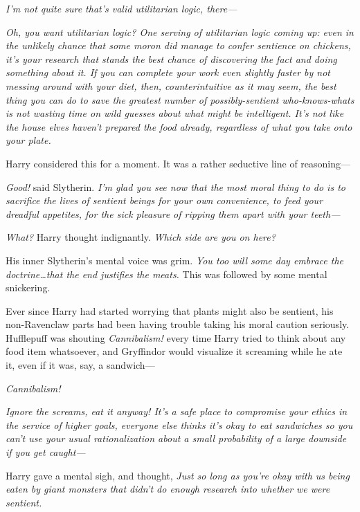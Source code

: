 \emph{I’m not quite sure that’s valid utilitarian logic, there—}

\emph{Oh, you want utilitarian logic? One serving of utilitarian logic coming up: even in the unlikely chance that some moron \emph{did} manage to confer sentience on chickens, it’s \emph{your} research that stands the best chance of discovering the fact and doing something about it. If you can complete your work even slightly faster by \emph{not} messing around with your diet, then, counterintuitive as it may seem, the \emph{best} thing you can do to save the greatest number of possibly-sentient who-knows-whats is \emph{not} wasting time on wild guesses about what might be intelligent. It’s not like the house elves haven’t prepared the food already, regardless of what you take onto your plate.}

Harry considered this for a moment. It was a rather seductive line of reasoning—

\emph{Good!} said Slytherin. \emph{I’m glad you see now that the most moral thing to do is to sacrifice the lives of sentient beings for your own convenience, to feed your dreadful appetites, for the sick pleasure of ripping them apart with your teeth—}

\emph{What?} Harry thought indignantly. \emph{Which side are you \emph{on} here?}

His inner Slytherin’s mental voice was grim. \emph{You too will some day embrace the doctrine…that the end justifies the meats.} This was followed by some mental snickering.

Ever since Harry had started worrying that plants might also be sentient, his non-Ravenclaw parts had been having trouble taking his moral caution seriously. Hufflepuff was shouting \emph{Cannibalism!} every time Harry tried to think about any food item whatsoever, and Gryffindor would visualize it screaming while he ate it, even if it was, say, a sandwich—

\emph{Cannibalism!}

\emph{}

\emph{Ignore the screams, eat it anyway! It’s a safe place to compromise your ethics in the service of higher goals, everyone \emph{else} thinks it’s okay to eat sandwiches so you can’t use your usual rationalization about a small probability of a large downside if you get caught—}

Harry gave a mental sigh, and thought, \emph{Just so long as you’re okay with \emph{us} being eaten by giant monsters that didn’t do enough research into whether \emph{we} were sentient.}

